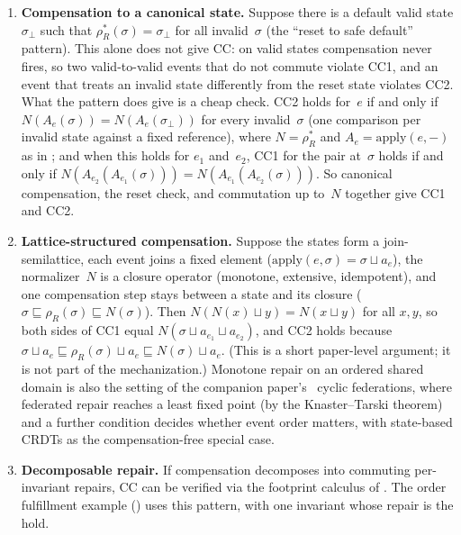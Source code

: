 \documentclass[11pt,a4paper]{article}
\theoremstyle{plain}
\theoremstyle{definition}
\theoremstyle{remark}
\begin{document}
\begin{enumerate}[leftmargin=*,nosep]
\item \textbf{Compensation to a canonical state.}\;  Suppose there is a
  default valid state $\sigma_\bot$ such that $\rho_R^*(\sigma) = \sigma_\bot$
  for all invalid~$\sigma$ (the ``reset to safe default'' pattern).  This
  alone does not give CC: on valid states compensation never fires, so two
  valid-to-valid events that do not commute violate CC1, and an event that
  treats an invalid state differently from the reset state violates CC2.
  What the pattern does give is a cheap check.  CC2 holds for~$e$ if and only
  if $N(A_e(\sigma)) = N(A_e(\sigma_\bot))$ for every invalid~$\sigma$ (one
  comparison per invalid state against a fixed reference), where
  $N = \rho_R^*$ and $A_e = \mathrm{apply}(e, -)$ as in
  ; and when this holds for $e_1$ and~$e_2$, CC1 for the
  pair at~$\sigma$ holds if and only if
  $N(A_{e_2}(A_{e_1}(\sigma))) = N(A_{e_1}(A_{e_2}(\sigma)))$.  So canonical
  compensation, the reset check, and commutation up to~$N$ together give CC1
  and CC2.
\item \textbf{Lattice-structured compensation.}\;  Suppose the states form a
  join-semilattice, each event joins a fixed element
  ($\mathrm{apply}(e, \sigma) = \sigma \sqcup a_e$), the normalizer~$N$ is a
  closure operator (monotone, extensive, idempotent), and one compensation
  step stays between a state and its closure
  ($\sigma \sqsubseteq \rho_R(\sigma) \sqsubseteq N(\sigma)$).  Then
  $N(N(x) \sqcup y) = N(x \sqcup y)$ for all $x, y$, so both sides of CC1
  equal $N(\sigma \sqcup a_{e_1} \sqcup a_{e_2})$, and CC2 holds because
  $\sigma \sqcup a_e \sqsubseteq \rho_R(\sigma) \sqcup a_e \sqsubseteq
  N(\sigma) \sqcup a_e$.  (This is a short paper-level argument; it is not
  part of the mechanization.)  Monotone repair on an ordered shared domain is
  also the setting of the companion paper's~\cite{blackwell2026federated}
  cyclic federations, where federated repair reaches a least fixed point (by
  the Knaster--Tarski theorem) and a further condition decides whether event
  order matters, with state-based CRDTs as the compensation-free special case.
\item \textbf{Decomposable repair.}\;  If compensation decomposes into
  commuting per-invariant repairs, CC can be verified via the footprint
  calculus of .  The order fulfillment example
  () uses this pattern, with one invariant whose repair is
  the hold.
\end{enumerate}
\end{document}
